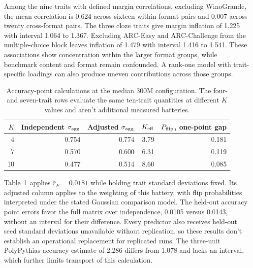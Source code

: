 Among the nine traits with defined margin correlations, excluding WinoGrande, the mean correlation is 0.624 across sixteen within-format pairs and 0.007 across twenty cross-format pairs. The three cloze traits give margin inflation of 1.225 with interval 1.064 to 1.367. Excluding ARC-Easy and ARC-Challenge from the multiple-choice block leaves inflation of 1.479 with interval 1.416 to 1.541. These associations show concentration within the larger format groups, while benchmark content and format remain confounded. A rank-one model with trait-specific loadings can also produce uneven contributions across those groups.

\begin{table}[htbp]
\centering\small
\caption{Accuracy-point calculations at the median 300M configuration. The four- and seven-trait rows evaluate the same ten-trait quantities at different $K$ values and aren't additional measured batteries.}
\label{tab:original8}
\begin{tabular}{rrrrr}\hline
$K$ & Independent $\sigma_{\rm agg}$ & Adjusted $\sigma_{\rm agg}$ & $K_{\rm eff}$ & $P_{\rm flip}$, one-point gap\\\hline
4 & 0.754 & 0.774 & 3.79 & 0.181\\
7 & 0.570 & 0.600 & 6.31 & 0.119\\
10 & 0.477 & 0.514 & 8.60 & 0.085\\\hline
\end{tabular}
\end{table}

Table~\ref{tab:original8} applies $\bar r_E=0.0181$ while holding trait standard deviations fixed. Its adjusted column applies to the weighting of this battery, with flip probabilities interpreted under the stated Gaussian comparison model. The held-out accuracy point errors favor the full matrix over independence, 0.0105 versus 0.0143, without an interval for their difference. Every predictor also receives held-out seed standard deviations unavailable without replication, so these results don't establish an operational replacement for replicated runs. The three-unit PolyPythias accuracy estimate of 2.286 differs from 1.078 and lacks an interval, which further limits transport of this calculation.

